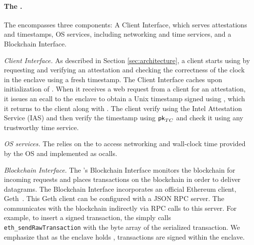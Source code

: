 \paragraph{The \medname.} The \medname encompasses three components: A Client Interface, which serves attestations and timestamps, OS services, including networking and time services, and a Blockchain Interface. 

\vspace{2mm}

\noindent\emph{Client Interface.} As described in Section \ref{sec:architecture},
a client starts using \tc by requesting and verifying an attestation \att and checking the correctness of the clock in the \tc enclave using a fresh timestamp.
The Client Interface caches \att upon initialization of \engine. When it receives a web request from a client for an attestation,
it issues an ecall to the enclave to obtain a
Unix timestamp signed using \skTC, which it returns to the client along with \att. The client verify \att 
using the Intel Attestation Service (IAS) and then verify the timestamp using ${\sf pk}_{TC}$ and check it using any trustworthy time service. 

\vspace{2mm}

\noindent\emph{OS services.} The \encname relies on the \medname to access networking and 
wall-clock time provided by the OS and implemented as ocalls.

\vspace{2mm}

\noindent\emph{Blockchain Interface.} The \medname's Blockchain Interface monitors the
blockchain for incoming requests and places transactions on the blockchain in order to
deliver datagrams. The Blockchain Interface incorporates an 
official Ethereum client, Geth~\cite{geth}. This Geth client can be configured with a JSON RPC server.  
The \medname  communicates with the blockchain indirectly via RPC calls to this server. For example, to insert a signed transaction, the \medname simply calls
\texttt{eth\_sendRawTransaction} with the byte array of the serialized
transaction. We emphasize that as the enclave holds \skTC, transactions are signed within the enclave.

